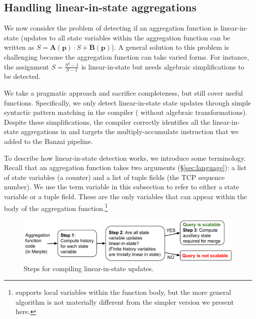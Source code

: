 \subsection{Handling linear-in-state aggregations}
\label{sec:linear-in-state-compilation}

We now consider the problem of detecting if an aggregation function is
linear-in-state (\ie updates to all state variables within the aggregation
function can be written as
$S = \boldsymbol{A}(\mathbf{p}) \cdot S + \boldsymbol{B}(\mathbf{p})$).
A general solution to
this problem is challenging because the aggregation function can take varied
forms. For instance, the assignment $S = \frac{S^2 - 1}{S -1}$ is
linear-in-state but needs algebraic simplifications to be detected.

We take a pragmatic approach and sacrifice completeness, but still cover useful
functions. Specifically, we only detect linear-in-state state updates through
simple syntactic pattern matching in the compiler (\ie 
without algebraic transformations).  Despite these simplifications, the \TheSystem
compiler correctly identifies all the linear-in-state aggregations in
 and targets the multiply-accumulate
instruction that we added to the Banzai pipeline.

To describe how linear-in-state detection works, we introduce some
terminology.  Recall that an aggregation function takes two arguments
(\S\ref{sec:language}): a list of state variables (\eg a counter) and a list of
tuple fields (\eg the TCP sequence number). We use the term variable in this
subsection to refer to either a state variable or a tuple field. These are the only variables that can appear within the body
of the aggregation function.\footnote{\TheSystem supports local variables within
  the function body, but the more general algorithm is not materially
  different from the simpler version we present here.}

\begin{figure}
\centering
\includegraphics[width=\columnwidth]{pq_compiler-steps.pdf}
\caption{Steps for compiling linear-in-state updates.}
\label{fig:compiler-steps}
\end{figure}

